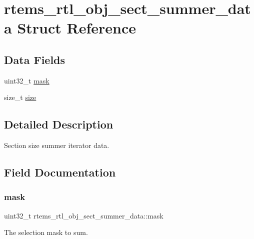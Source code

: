 \hypertarget{structrtems__rtl__obj__sect__summer__data}{}\section{rtems\+\_\+rtl\+\_\+obj\+\_\+sect\+\_\+summer\+\_\+data Struct Reference}
\label{structrtems__rtl__obj__sect__summer__data}
\subsection*{Data Fields}
\begin{DoxyCompactItemize}
\item 
uint32\+\_\+t \mbox{\hyperlink{structrtems__rtl__obj__sect__summer__data_ace7c8460f6879668d19b7b1137888d29}{mask}}
\item 
size\+\_\+t \mbox{\hyperlink{structrtems__rtl__obj__sect__summer__data_a3947491bbd9e962cd0808688d8496a0f}{size}}
\end{DoxyCompactItemize}


\subsection{Detailed Description}
Section size summer iterator data. 

\subsection{Field Documentation}
\mbox{\label{structrtems__rtl__obj__sect__summer__data_ace7c8460f6879668d19b7b1137888d29}} 
\subsubsection{\texorpdfstring{mask}{mask}}
{\footnotesize\ttfamily uint32\+\_\+t rtems\+\_\+rtl\+\_\+obj\+\_\+sect\+\_\+summer\+\_\+data\+::mask}

The selection mask to sum. \mbox{\label{structrtems__rtl__obj__sect__summer__data_a3947491bbd9e962cd0808688d8496a0f}} 
